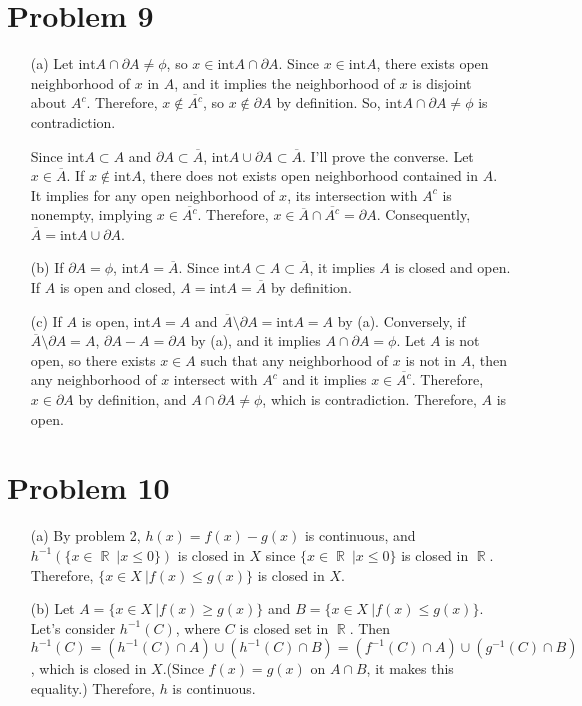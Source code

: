 \documentclass{article}
\DeclareMathOperator{\rr}{\mathbb{R}}
\begin{document}
\section*{Problem 9}
\begin{enumerate}
\item[(a)] Let $\text{int} A\cap \partial A\neq \phi$, so $x\in \text{int} A\cap \partial A$. Since $x\in \text{int} A$, there exists open neighborhood of $x$ in $A$, and it implies the neighborhood of $x$ is disjoint about $A^c$. Therefore, $x\notin \overline{A^c}$, so $x\notin \partial A$ by definition. So, $\text{int} A\cap \partial A\neq \phi$ is contradiction.

Since $\text{int} A\subset A$ and $\partial A\subset \overline{A}$, $\text{int} A\cup \partial A\subset \overline{A}$. I'll prove the converse. Let $x\in \overline{A}$. If $x\notin \text{int} A$, there does not exists open neighborhood contained in $A$. It implies for any open neighborhood of $x$, its intersection with $A^c$ is nonempty, implying $x\in\overline{A^c}$. Therefore, $x\in \overline{A}\cap\overline{A^c}=\partial A$. Consequently, $\overline{A}=\text{int} A \cup \partial A$.
\item[(b)] If $\partial A=\phi$, $\text{int}A=\overline{A}$. Since $\text{int}A\subset A\subset \overline{A}$, it implies $A$ is closed and open. If $A$ is open and closed, $A=\text{int}A=\overline{A}$ by definition.
\item[(c)] If $A$ is open, $\text{int}A=A$ and $\overline{A}\setminus\partial A=\text{int} A=A$ by (a). Conversely, if $\overline{A}\setminus\partial A=A$, $\partial A-A=\partial A$ by (a), and it implies $A\cap \partial A=\phi$. Let $A$ is not open, so there exists $x\in A$ such that any neighborhood of $x$ is not in $A$, then any neighborhood of $x$ intersect with $A^c$ and it implies $x\in \overline{A^c}$. Therefore, $x\in \partial A$ by definition, and $A\cap \partial A\neq \phi$, which is contradiction. Therefore, $A$ is open.
\end{enumerate}

\section*{Problem 10}
\begin{enumerate}
\item[(a)] By problem 2, $h(x)=f(x)-g(x)$ is continuous, and $h^{-1}\left(\{x\in \rr~|x\leq 0\}\right)$ is closed in $X$ since $\{x\in \rr~|x\leq 0\}$ is closed in $\rr$. Therefore, $\{x\in X~|f(x)\leq g(x)\}$ is closed in $X$.
\item[(b)] Let $A=\{x\in X~|f(x)\geq g(x)\}$ and $B=\{x\in X~|f(x)\leq g(x)\}$. Let's consider $h^{-1}(C)$, where $C$ is closed set in $\rr$. Then $h^{-1}(C)=\left(h^{-1}(C)\cap A\right) \cup \left(h^{-1}(C)\cap B\right)=\left(f^{-1}(C)\cap A\right)\cup \left(g^{-1}(C)\cap B\right)$, which is closed in $X$.(Since $f(x)=g(x)$ on $A\cap B$, it makes this equality.) Therefore, $h$ is continuous.
\end{enumerate}
\end{document}
